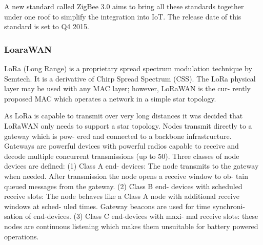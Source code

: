 A new standard called ZigBee 3.0 aims to bring all these standards together under one roof to simplify the integration into IoT.
The release date of this standard is set to Q4 2015.

\subsubsection{LoaraWAN}

LoRa (Long Range) is a proprietary spread spectrum
modulation technique by Semtech. It is a derivative of Chirp
Spread Spectrum (CSS). The LoRa physical layer may be
used with any MAC layer; however, LoRaWAN is the cur-
rently proposed MAC which operates a network in a simple
star topology. 

As LoRa is capable to transmit over very long distances
it was decided that LoRaWAN only needs to support a star
topology. Nodes transmit directly to a gateway which is pow-
ered and connected to a backbone infrastructure. Gateways
are powerful devices with powerful radios capable to receive
and decode multiple concurrent transmissions (up to 50).
Three classes of node devices are defined: (1) Class A end-
devices: The node transmits to the gateway when needed.
After transmission the node opens a receive window to ob-
tain queued messages from the gateway. (2) Class B end-
devices with scheduled receive slots: The node behaves like
a Class A node with additional receive windows at sched-
uled times. Gateway beacons are used for time synchroni-
sation of end-devices. (3) Class C end-devices with maxi-
mal receive slots: these nodes are continuous listening which
makes them unsuitable for battery powered operations.

\clearpage

